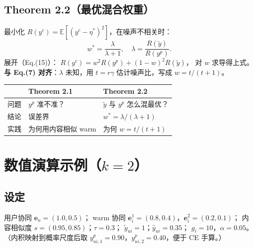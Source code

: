 \documentclass[11pt,a4paper]{ctexart}
\begin{document}
\subsection{Theorem 2.2（最优混合权重）}
最小化 $R(y^{c})=\mathbb{E}[(y^{c}-\eta^*)^2]$，在噪声不相关时：
\[
w^*=\frac{\lambda}{\lambda+1},\quad
\lambda=\frac{R(\tilde{y})}{R(y^{p})}.
\]
展开（Eq.(15)）：
$R(y^{c})=w^2 R(y^{p})+(1-w)^2 R(\tilde{y})$，
对 $w$ 求导得上式。\\
\textbf{与 Eq.(7) 对齐}：$\lambda$ 未知，用 $t=r\gamma$ 估计噪声比，写成 $w=t/(t+1)$。

\begin{center}
\small
\begin{tabular}{p{3cm}p{5.5cm}p{5.5cm}}
\toprule
 & \textbf{Theorem 2.1} & \textbf{Theorem 2.2} \\
\midrule
问题 & $y^{p}$ 准不准？ & $\tilde{y}$ 与 $y^{p}$ 怎么混最优？ \\
结论 & 误差界 & $w^*=\lambda/(\lambda+1)$ \\
实践 & 为何用内容相似 warm & 为何 $w=t/(t+1)$ \\
\bottomrule
\end{tabular}
\end{center}

\section{数值演算示例（$k=2$）}

\subsection{设定}
用户协同 $\mathbf{e}_u=(1.0,0.5)$；
warm 协同 $\mathbf{e}_i^{1}=(0.8,0.4)$，$\mathbf{e}_i^{2}=(0.2,0.1)$；
内容相似度 $s=(0.95,0.85)$；$\tau=0.3$；
$\tilde{y}_{ui}=1$；$\hat{y}_{ui}=0.35$；
$g_i=10$，$\alpha=0.05$。\\
（内积映射到概率尺度后取 $y^{p}_{ui,1}=0.90$，$y^{p}_{ui,2}=0.40$，便于 CE 手算。）
\end{document}
